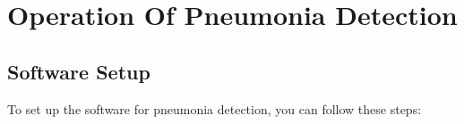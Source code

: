 %

\chapter{Operation Of Pneumonia Detection}

\section{Software Setup}
To set up the software for pneumonia detection, you can follow these steps:
